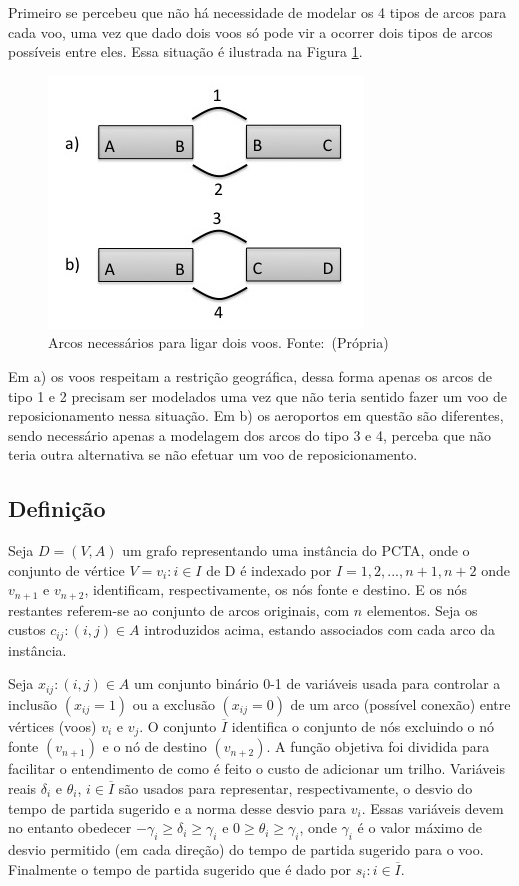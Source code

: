 Primeiro se percebeu que não há necessidade de modelar os 4 tipos de arcos para
cada voo, uma vez que dado dois voos só pode vir a ocorrer dois tipos de arcos
possíveis entre eles. Essa situação é ilustrada na Figura
\ref{fig:modelagem_arcos}.

\begin{figure}[ht]
	\centering
	\caption{Arcos necessários para ligar dois voos. \mbox{Fonte:
	(Própria)}}\label{fig:modelagem_arcos}
	\includegraphics[scale=0.4]{./img/modelagem_arcos}
\end{figure}


Em a) os voos respeitam a restrição geográfica, dessa forma apenas os arcos de
tipo 1 e 2 precisam ser modelados uma vez que não teria sentido fazer um voo de
reposicionamento nessa situação. Em b) os aeroportos em questão são diferentes,
sendo necessário apenas a modelagem dos arcos do tipo 3 e 4, perceba que não
teria outra alternativa se não efetuar um voo de reposicionamento.

\subsection{Definição}

Seja $D = (V,A)$ um grafo representando uma instância do PCTA, onde o conjunto
de vértice $V = {v_{i}:i \in I}$ de D é indexado por $I = {1, 2, ..., n+1,
n+2}$ onde $v_{n+1}$ e $v_{n+2}$, identificam, respectivamente, os nós fonte e
destino. E os nós restantes referem-se ao conjunto de arcos originais, com $n$
elementos. Seja os custos ${c_{ij}:(i,j) \in A}$ introduzidos acima, estando
associados com cada arco da instância.
  
Seja ${x_{ij}:(i,j) \in A}$ um conjunto binário 0-1 de variáveis usada para
controlar a inclusão $(x_{ij} = 1)$ ou a exclusão $(x_{ij} = 0)$ de um arco
(possível conexão) entre vértices (voos) $v_{i}$ e $v_{j}$. O conjunto
$\overline{I}$ identifica o conjunto de nós excluindo o nó fonte $(v_{n+1})$ e
o nó de destino $(v_{n+2})$. A função objetiva foi dividida para facilitar o
entendimento de como é feito o custo de adicionar um trilho. Variáveis reais
$\delta_{i}$ e $\theta_{i}$, $i \in \overline{I}$ são usados para representar,
respectivamente, o desvio do tempo de partida sugerido e a norma desse desvio
para $v_{i}$. Essas variáveis devem no entanto obedecer $-\gamma_{i} \geq
\delta_{i} \geq \gamma_{i}$ e $0 \geq \theta_{i} \geq \gamma_{i}$, onde
$\gamma_{i}$ é o valor máximo de desvio permitido (em cada direção) do tempo de
partida sugerido para o voo. Finalmente o tempo de partida sugerido que é dado
por $s_{i}:i \in \overline{I}$.
  

